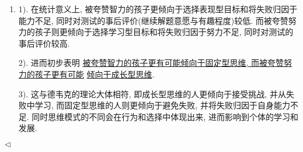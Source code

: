 \documentclass[11pt]{article}
\newenvironment{answer}[1][Solution]{\begin{trivlist}
\item[\hskip \labelsep {\bfseries #1.}\hskip \labelsep]}{\hfill$\lhd$\end{trivlist}}
\newcommand\1{\mathds{1}}
\begin{document}
\begin{answer}
\begin{enumerate}[label=(\arabic*)]
\begin{itemize}
        \end{itemize}
        \item 1). 在统计意义上, 被夸赞智力的孩子更倾向于选择表现型目标和将失败归因于能力不足, 同时对测试的事后评价(继续解题意愿与有趣程度)较低. 而被夸赞努力的孩子则更倾向于选择学习型目标和将失败归因于努力不足, 同时对测试的事后评价较高. 
        
        2). 进而初步表明 \underline{被夸赞智力的孩子更有可能倾向于固定型思维, 而被夸赞努力的孩子更有可能} \underline{倾向于成长型思维}. 
        
        3). 这与德韦克的理论大体相符, 即成长型思维的人更倾向于接受挑战, 并从失败中学习, 而固定型思维的人则更倾向于避免失败, 并将失败归因于自身能力不足. 同时思维模式的不同会在行为和选择中体现出来, 进而影响到个体的学习和发展.
    \end{enumerate}
\end{answer}
\end{document}

